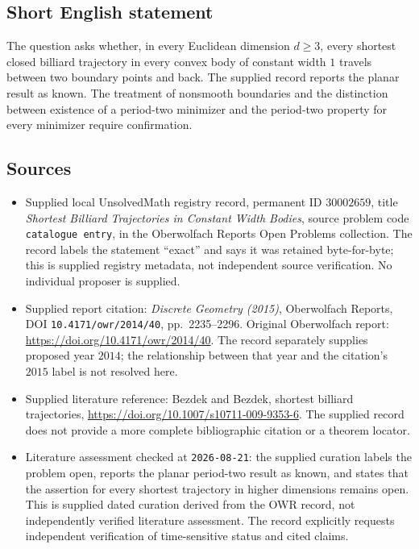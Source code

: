 \documentclass[11pt]{article}
\begin{document}
\subsection{Short English statement}
The question asks whether, in every Euclidean dimension \(d\geq3\), every shortest closed billiard trajectory in every convex body of constant width \(1\) travels between two boundary points and back. The supplied record reports the planar result as known. The treatment of nonsmooth boundaries and the distinction between existence of a period-two minimizer and the period-two property for every minimizer require confirmation.
\subsection{Sources}
\begin{itemize}
\item Supplied local UnsolvedMath registry record, permanent ID \(30002659\), title \emph{Shortest Billiard Trajectories in Constant Width Bodies}, source problem code \texttt{catalogue entry}, in the Oberwolfach Reports Open Problems collection. The record labels the statement ``exact'' and says it was retained byte-for-byte; this is supplied registry metadata, not independent source verification. No individual proposer is supplied.
\item Supplied report citation: \emph{Discrete Geometry (2015)}, Oberwolfach Reports, DOI \texttt{10.4171/owr/2014/40}, pp.\ 2235--2296. Original Oberwolfach report: \url{https://doi.org/10.4171/owr/2014/40}. The record separately supplies proposed year \(2014\); the relationship between that year and the citation's \(2015\) label is not resolved here.
\item Supplied literature reference: Bezdek and Bezdek, shortest billiard trajectories, \url{https://doi.org/10.1007/s10711-009-9353-6}. The supplied record does not provide a more complete bibliographic citation or a theorem locator.
\item Literature assessment checked at \texttt{2026-08-21}: the supplied curation labels the problem open, reports the planar period-two result as known, and states that the assertion for every shortest trajectory in higher dimensions remains open. This is supplied dated curation derived from the OWR record, not independently verified literature assessment. The record explicitly requests independent verification of time-sensitive status and cited claims.
\end{itemize}
\end{document}
